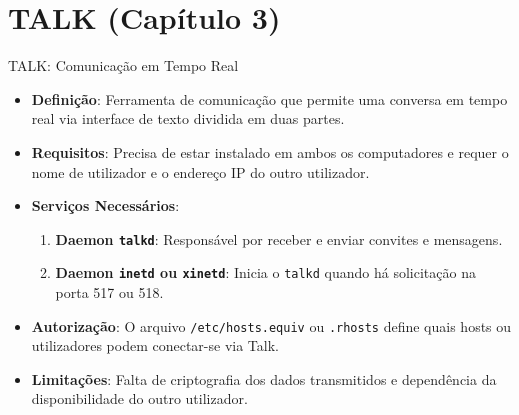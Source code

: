\documentclass{beamer}
\begin{document}
	\section{TALK (Capítulo 3)}
	\begin{frame}{TALK: Comunicação em Tempo Real}
		\begin{itemize}
			\item \textbf{Definição}: Ferramenta de comunicação que permite uma conversa em tempo real via interface de texto dividida em duas partes.
			\item \textbf{Requisitos}: Precisa de estar instalado em ambos os computadores e requer o nome de utilizador e o endereço IP do outro utilizador.
			\item \textbf{Serviços Necessários}:
			\begin{enumerate}
				\item \textbf{Daemon \texttt{talkd}}: Responsável por receber e enviar convites e mensagens.
				\item \textbf{Daemon \texttt{inetd} ou \texttt{xinetd}}: Inicia o \texttt{talkd} quando há solicitação na porta 517 ou 518.
			\end{enumerate}
			\item \textbf{Autorização}: O arquivo \texttt{/etc/hosts.equiv} ou \texttt{.rhosts} define quais hosts ou utilizadores podem conectar-se via Talk.
			\item \textbf{Limitações}: Falta de criptografia dos dados transmitidos e dependência da disponibilidade do outro utilizador.
		\end{itemize}
	\end{frame}
	
\end{document}
